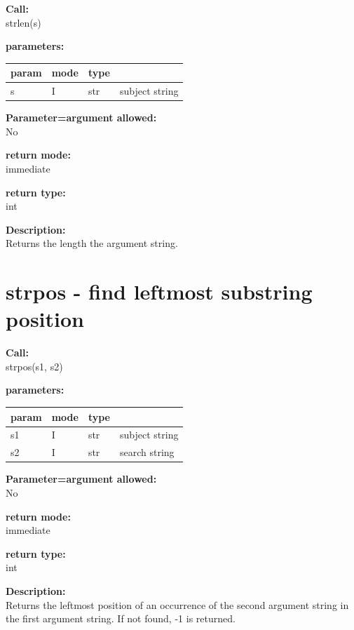         {\bf Call:} \\
        strlen(s)
        
        {\bf parameters:} \\
        \begin{tabular}{| l | l | l | l |}
        \hline
        param  & mode & type & \\
        \hline \hline
        s & I & str & subject string   \\ \hline
        \end{tabular}
        
        {\bf Parameter=argument allowed:} \\
        No
        
        {\bf return mode:} \\
        immediate

        {\bf return type:} \\
        int
        
        {\bf Description:} \\
        Returns the length the argument string.


    \section{strpos - find leftmost substring position}\label{sec:ifstrpos}
        
        {\bf Call:} \\
        strpos(s1, s2)
        
        {\bf parameters:} \\
        \begin{tabular}{| l | l | l | l |}
        \hline
        param  & mode & type & \\
        \hline \hline
        s1 & I & str & subject string   \\ \hline
        s2 & I & str & search string    \\ \hline
        \end{tabular}
        
        {\bf Parameter=argument allowed:} \\
        No
        
        {\bf return mode:} \\
        immediate

        {\bf return type:} \\
        int
        
        {\bf Description:} \\
        Returns the leftmost position of an occurrence of the second argument
        string in the first argument string. If not found, -1 is returned.


